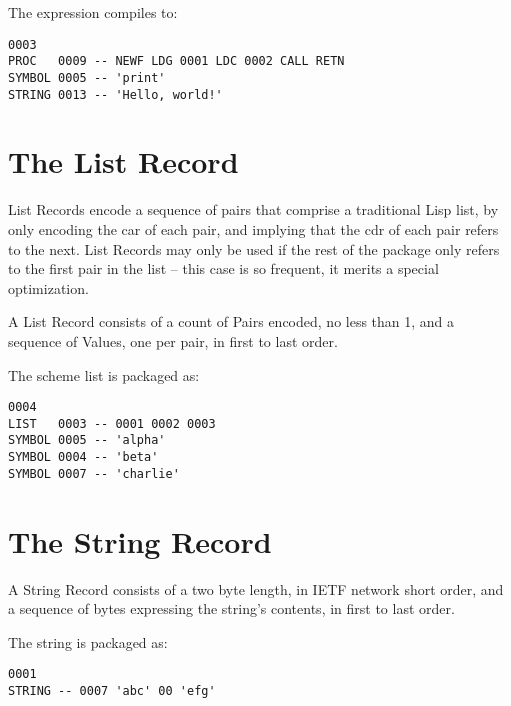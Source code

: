 \documentclass[notitlepage,oneside]{book}
\begin{document}
The expression  compiles to:


\begin{verbatim}
0003
PROC   0009 -- NEWF LDG 0001 LDC 0002 CALL RETN
SYMBOL 0005 -- 'print'
STRING 0013 -- 'Hello, world!'
\end{verbatim}

\section{The List Record}
\label{list-record}

List Records encode a sequence of pairs that comprise a traditional Lisp list, by only encoding the car of each pair, and implying that the cdr of each pair refers to the next.  List Records may only be used if the rest of the package only refers to the first pair in the list -- this case is so frequent, it merits a special optimization.

A List Record consists of a count of Pairs encoded, no less than 1, and a sequence of Values, one per pair, in first to last order.

The scheme list  is packaged as:

\begin{verbatim}
0004 
LIST   0003 -- 0001 0002 0003
SYMBOL 0005 -- 'alpha'
SYMBOL 0004 -- 'beta'
SYMBOL 0007 -- 'charlie'
\end{verbatim}

\section{The String Record}
\label{string-record}

A String Record consists of a two byte length, in IETF network short order, and a sequence of bytes expressing the string's contents, in first to last order.  

The string  is packaged as:

\begin{verbatim}
0001
STRING -- 0007 'abc' 00 'efg'
\end{verbatim}

\printindex
\end{document}
